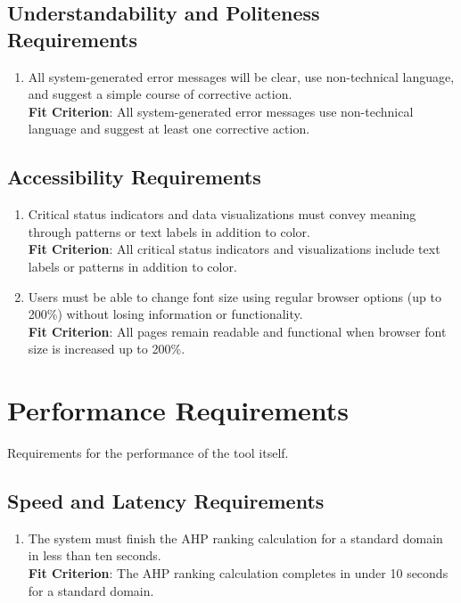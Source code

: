 \documentclass[12pt]{article}
\begin{document}
\subsection{Understandability and Politeness Requirements}
\begin{enumerate}[label=UH-UP\arabic*]
\item All system-generated error messages will be clear, use non-technical language, and suggest a simple course of corrective action.
  \\ \textbf{Fit Criterion}: All system-generated error messages use non-technical language and suggest at least one corrective action.
\end{enumerate}
\subsection{Accessibility Requirements}
\begin{enumerate}[label=UH-AR\arabic*]
  \item Critical status indicators and data visualizations must convey meaning through patterns or text labels in addition to color.
  \\ \textbf{Fit Criterion}: All critical status indicators and visualizations include text labels or patterns in addition to color.
  \item Users must be able to change font size using regular browser options (up to 200\%) without losing information or functionality.
  \\ \textbf{Fit Criterion}: All pages remain readable and functional when browser font size is increased up to 200\%.
\end{enumerate}

\section{Performance Requirements}
Requirements for the performance of the tool itself.
\subsection{Speed and Latency Requirements}
\begin{enumerate}[label=PR-SL\arabic*]
  \item The system must finish the AHP ranking calculation for a standard domain in less than ten seconds.
  \\ \textbf{Fit Criterion}: The AHP ranking calculation completes in under 10 seconds for a standard domain.
\end{enumerate}
\end{document}
